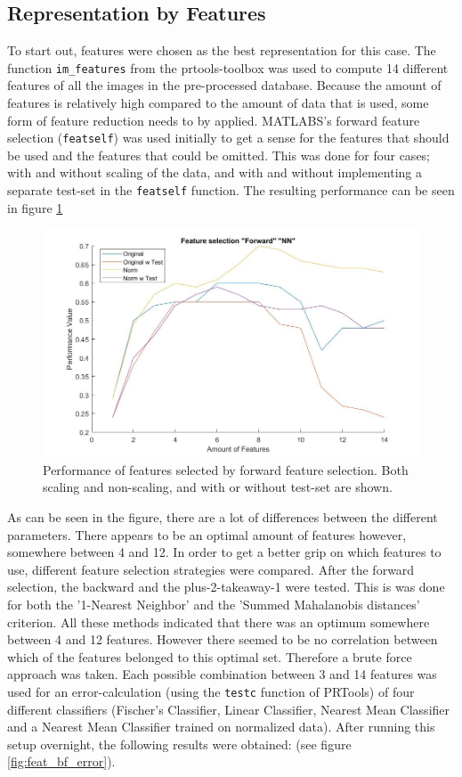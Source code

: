 \subsection{Representation by Features}
To start out, features were chosen as the best representation for this case. The function \texttt{im\_features} from the prtools-toolbox was used to compute 14 different features of all the images in the pre-processed database. Because the amount of features is relatively high compared to the amount of data that is used, some form of feature reduction needs to by applied. MATLABS's forward feature selection (\texttt{featself}) was used initially to get a sense for the features that should be used and the features that could be omitted. This was done for four cases; with and without scaling of the data, and with and without implementing a separate test-set in the \texttt{featself} function. The resulting performance can be seen in figure \ref{fig:featsel_perf}
\begin{figure}[H]
	\centering
	\includegraphics[scale=0.45]{images/featsel_perf.jpg}
	\caption{Performance of features selected by forward feature selection. Both scaling and non-scaling, and with or without test-set are shown.}
	\label{fig:featsel_perf}
\end{figure}
\noindent As can be seen in the figure, there are a lot of differences between the different parameters. There appears to be an optimal amount of features however, somewhere between 4 and 12. In order to get a better grip on which features to use, different feature selection strategies were compared. After the forward selection, the backward and the plus-2-takeaway-1 were tested. This is was done for both the '1-Nearest Neighbor' and the 'Summed Mahalanobis distances' criterion. All these methods indicated that there was an optimum somewhere between 4 and 12 features. However there seemed to be no correlation between which of the features belonged to this optimal set. Therefore a brute force approach was taken. Each possible combination between 3 and 14 features was used for an error-calculation (using the \texttt{testc}  function of PRTools) of four different classifiers (Fischer's Classifier, Linear Classifier, Nearest Mean Classifier and a Nearest Mean Classifier trained on normalized data). After running this setup overnight, the following results were obtained: (see figure \ref{fig:feat_bf_error}).

